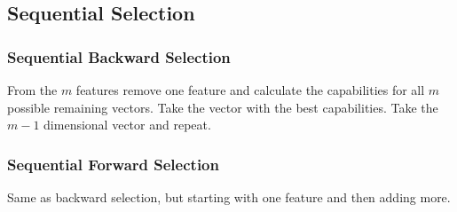 \subsection{Sequential Selection}
\subsubsection{Sequential Backward Selection}
From the $m$ features remove one feature and calculate the capabilities for all $m$ possible remaining vectors. Take the vector with the best capabilities. Take the $m-1$ dimensional vector and repeat.

\subsubsection{Sequential Forward Selection}
Same as backward selection, but starting with one feature and then adding more.
